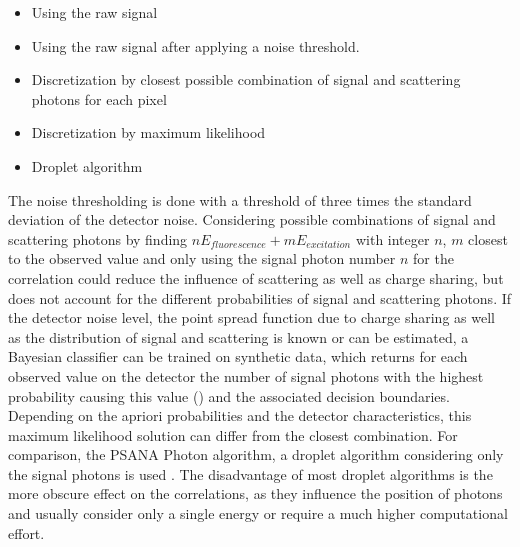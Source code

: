 \begin{itemize}[nosep]
	\item Using the raw signal
	\item Using the raw signal after applying a noise threshold.
	\item Discretization by closest possible combination of signal and scattering photons for each pixel
	\item Discretization by maximum likelihood
	\item Droplet algorithm
\end{itemize}
The noise thresholding is done with a threshold of three times the standard deviation of the detector noise. Considering possible combinations of signal and scattering photons by finding  $nE_{fluorescence}+mE_{excitation}$ with integer $n$, $m$ closest to the observed value and only using the signal photon number $n$ for the correlation could reduce the influence of scattering as well as charge sharing, but does not account for the different probabilities of signal and scattering photons. If the detector noise level, the point spread function due to charge sharing as well as the distribution of signal and scattering is known or can be estimated, a Bayesian classifier can be trained on synthetic data, which returns for each observed value on the detector the number of signal photons with the highest probability causing this value () and the associated decision boundaries. Depending on the apriori probabilities and the detector characteristics, this maximum likelihood solution can differ from the closest combination. For comparison, the PSANA Photon algorithm, a droplet algorithm considering only the signal photons is used \cite{psana}. The disadvantage of most droplet algorithms is the more obscure effect on the correlations, as they influence the position of photons and usually consider only a single energy or require a much higher computational effort.  

